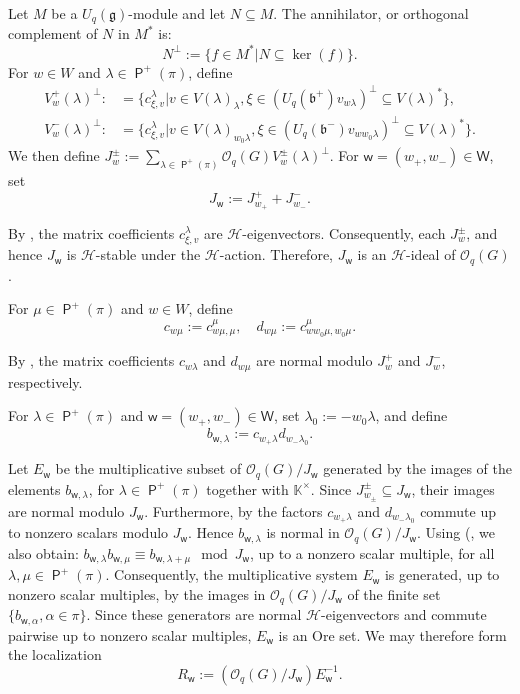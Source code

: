 \documentclass[11pt]{article}
\theoremstyle{definition}
\numberwithin{equation}{section}
\newcommand{\KK}{\mathbb{K}}
\newcommand{\qu}{\mathcal{O}}
\newcommand{\Hf}{\mathcal{H}} %
\DeclareMathOperator{\pois}{\mathsf{P}}
\newcommand\g{\mathfrak{g}}
\newcommand\bor{\mathfrak{b}}
\newcommand\W{\mathsf{W}}
\newcommand\w{\mathsf{w}}
\begin{document}
	Let $M$ be a $U_q(\g)$-module and let $N\subseteq M$. The annihilator, or orthogonal complement of $N$ in $M^{\ast}$ is:
	$$N^{\perp}:= \{f\in M^{\ast}| N\subseteq\ker(f)\}.$$
	For $w\in W$ and $\lambda\in\pois^{+}(\pi)$, define
	\begin{align*}
		V_{w}^{+}(\lambda)^{\perp}:&= \{c_{\xi,v}^{\lambda}| v\in V(\lambda)_{\lambda}, \xi\in(U_q(\bor^{+})v_{w\lambda})^{\perp}\subseteq V(\lambda)^{\ast}\},\\
		V_{w}^{-}(\lambda)^{\perp}:&= \{c_{\xi,v}^{\lambda}| v\in V(\lambda)_{w_0\lambda}, \xi\in(U_q(\bor^{-})v_{ww_0\lambda})^{\perp}\subseteq V(\lambda)^{\ast}\}.
	\end{align*}
	We then define $J_{w}^{\pm}:= \sum_{\lambda\in\pois^{+}(\pi)}\qu_q(G)V_{w}^{\pm}(\lambda)^{\perp}$. For $\w= (w_{+},w_{-})\in\W$, set
	\begin{equation}\label{minideal}
		J_{\w}:= J_{w_{+}}^{+}+ J_{w_{-}}^{-}.
	\end{equation}
	
	By \cite[Exercise II.4.C]{BG02}, the matrix coefficients $c_{\xi,v}^{\lambda}$ are $\Hf$-eigenvectors. Consequently, each $J_w^{\pm}$, and hence $J_{\w}$ is  $\Hf$-stable under the $\Hf$-action. Therefore, $J_{\w}$ is an $\Hf$-ideal of $\qu_q(G)$. 
	
	For $\mu\in\pois^{+}(\pi)$ and  $w\in W$, define
	$$c_{w\mu}:= c_{w\mu, \mu}^{\mu}, \quad d_{w\mu}:= c_{ww_0\mu,w_0\mu}^{\mu}.$$
	
    By \cite[9.1.5]{JO95}, the matrix coefficients  $c_{w\lambda}$ and $d_{w\mu}$ are normal modulo $J_{w}^+$ and  $J_w^-$, respectively.
	
	For $\lambda\in\pois^+(\pi)$ and $\w=(w_+,w_-)\in \W$, set $\lambda_0:= -w_0\lambda$, and define
	$$b_{\w,\lambda}:= c_{w_+\lambda}d_{w_-\lambda_0}.$$ 
	
	Let $E_{\w}$ be the multiplicative subset of $\qu_q(G)/J_{\w}$ generated by the images of the elements $b_{\w,\lambda}$, for $\lambda\in\pois^+(\pi)$ together with $\KK^{\times}$. Since $J_{w_{\pm}}^{\pm}\subseteq J_{\w}$, their images are normal modulo $J_{\w}$. Furthermore,  by \cite[9.1.5]{JO95} the factors $c_{w_+\lambda}$ and $d_{w_-\lambda_0}$ commute up to nonzero scalars  modulo $J_{\w}$.  Hence $b_{\w,\lambda}$ is normal in $\qu_q(G)/J_{\w}$.  Using (\cite[9.1.10]{JO95}, we also obtain: $b_{\w,\lambda}b_{\w,\mu}\equiv b_{\w,\lambda+\mu}\mod J_{\w}$, up to a nonzero scalar multiple, for all  $\lambda,\mu\in\pois^{+}(\pi)$. Consequently, the multiplicative system $E_{\w}$ is generated, up to nonzero scalar multiples, by the images in $\qu_q(G)/J_{\w}$ of the finite set $\{ b_{\w,\alpha}, \alpha\in\pi\}$.  Since these generators are normal $\Hf$-eigenvectors and commute pairwise up to nonzero scalar multiples, $E_{\w}$ is an Ore set. We may therefore form the localization
	$$R_{\w}:= (\qu_q(G)/J_{\w})E_{\w}^{-1}.$$
	
\end{document}
